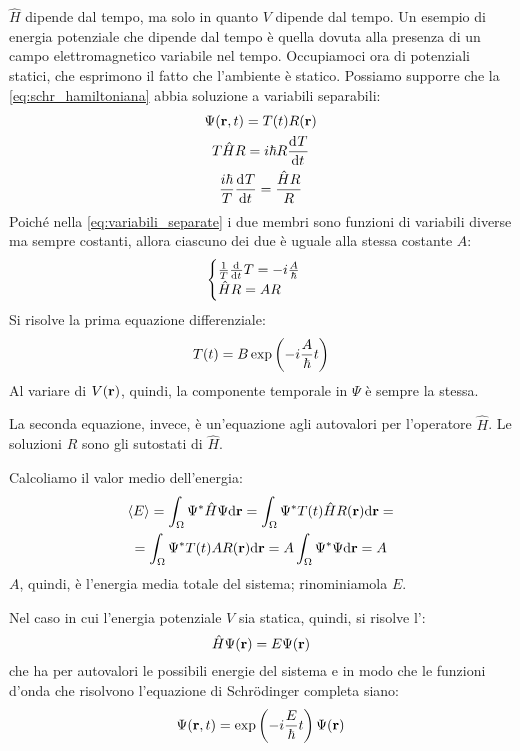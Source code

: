 $\hat{H}$ dipende dal tempo, ma solo in quanto $V$ dipende dal tempo.
Un esempio di energia potenziale che dipende dal tempo è quella dovuta alla presenza di un campo elettromagnetico variabile nel tempo.
Occupiamoci ora di potenziali statici, che esprimono il fatto che l'ambiente è statico.
Possiamo supporre che la \eqref{eq:schr_hamiltoniana} abbia soluzione a variabili separabili:
\begin{gather}
    \Psi(\p, t) = T(t) R(\p) \\
    T \hat{H} R = \im \hbar R \der[T]{t} \\
\label{eq:variabili_separate}
    \frac{\im \hbar}{T} \der[T]{t} = \frac{\hat{H} R}{R}
\end{gather}
Poiché nella \eqref{eq:variabili_separate} i due membri sono funzioni di variabili diverse ma sempre costanti, allora ciascuno dei due è uguale alla stessa costante $A$:
\begin{equation}
    \begin{cases}
        \frac{1}{T} \der[T]{t} = -\im \frac{A}{\hbar} \\
        \hat{H} R = A R
    \end{cases}
\end{equation}
Si risolve la prima equazione differenziale:
\begin{equation}
    T(t) = B \operatorname{exp}\left( -i \frac{A}{\hbar} t \right)
\end{equation}
Al variare di $V(\mathbf{r})$, quindi, la componente temporale in $\Psi$ è sempre la stessa.

La seconda equazione, invece, è un'equazione agli autovalori per l'operatore $\hat{H}$.
Le soluzioni $R$ sono gli sutostati di $\hat{H}$.

Calcoliamo il valor medio dell'energia:
\begin{equation}
\begin{gathered}
    \left\langle E \right\rangle = \int_\Omega \Psi^* \hat{H} \Psi \mathrm{d}\mathbf{r}
    = \int_\Omega \Psi^* T(t) \hat{H} R(\mathbf{r}) \mathrm{d}\mathbf{r} = \\
    = \int_\Omega \Psi^* T(t) A R(\mathbf{r}) \mathrm{d}\mathbf{r}
    = A \int_\Omega \Psi^* \Psi \mathrm{d}\mathbf{r}
    = A
\end{gathered}
\end{equation}
$A$, quindi, è l'energia media totale del sistema;
rinominiamola $E$.

Nel caso in cui l'energia potenziale $V$ sia statica, quindi, si risolve l':
\begin{equation}
    \hat{H} \Psi(\mathbf{r}) = E \Psi(\mathbf{r})
\end{equation}
che ha per autovalori le possibili energie del sistema e in modo che le funzioni d'onda che risolvono l'equazione di Schrödinger completa siano:
\begin{equation}
    \Psi(\mathbf{r}, t) = \operatorname{exp}\left( -i \frac{E}{\hbar} t \right) \Psi(\mathbf{r})
\end{equation}


